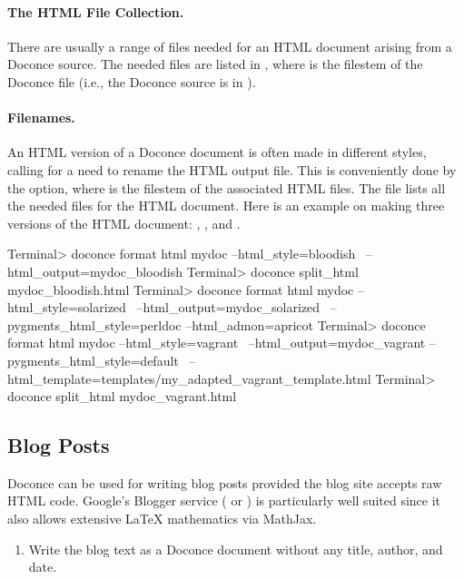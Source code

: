 \documentclass[%
oneside,                 %
final,                   %
10pt]{article}
\begin{document}
{{{\paragraph{The HTML File Collection.}
There are usually a range of files needed for an HTML document arising
from a Doconce source. The needed files are listed in
, where  is the filestem of
the Doconce file (i.e., the Doconce source is in ).

\paragraph{Filenames.}
An HTML version of a Doconce document is often made in different styles,
calling for a need to rename the HTML output file. This is conveniently
done by the  option, where  is the
filestem of the associated HTML files. The
 file lists all the needed files
for the HTML document. Here is an example on making three versions of
the HTML document: , , and
.

\bsys
Terminal> doconce format html mydoc --html_style=bloodish \ 
          --html_output=mydoc_bloodish
Terminal> doconce split_html mydoc_bloodish.html
Terminal> doconce format html mydoc --html_style=solarized \ 
          --html_output=mydoc_solarized \ 
          --pygments_html_style=perldoc --html_admon=apricot
Terminal> doconce format html mydoc --html_style=vagrant \ 
          --html_output=mydoc_vagrant --pygments_html_style=default \ 
          --html_template=templates/my_adapted_vagrant_template.html
Terminal> doconce split_html mydoc_vagrant.html
\esys

\subsection{Blog Posts}

Doconce can be used for writing blog posts provided the blog site accepts
raw HTML code. Google's Blogger service ( or
) is particularly well suited since it also
allows extensive {\LaTeX} mathematics via MathJax.

\begin{enumerate}
\item Write the blog text as a Doconce document without any
   title, author, and date.


\end{enumerate}}}}
\end{document}
